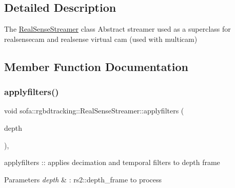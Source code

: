 \subsection{Detailed Description}
The \hyperlink{classsofa_1_1rgbdtracking_1_1_real_sense_streamer}{Real\+Sense\+Streamer} class Abstract streamer used as a superclass for realsensecam and realsense virtual cam (used with multicam) 

\subsection{Member Function Documentation}
\mbox{\label{classsofa_1_1rgbdtracking_1_1_real_sense_streamer_a2764d9aa83b005b5872f195599b98fc6}} 
\subsubsection{\texorpdfstring{applyfilters()}{applyfilters()}}
{\footnotesize\ttfamily void sofa\+::rgbdtracking\+::\+Real\+Sense\+Streamer\+::applyfilters (\begin{DoxyParamCaption}\item[{rs2\+::depth\+\_\+frame \&}]{depth }\end{DoxyParamCaption})\hspace{0.3cm}{\ttfamily [inline]}, {\ttfamily [protected]}}



applyfilters \+:\+: applies decimation and temporal filters to depth frame 


\begin{DoxyParams}{Parameters}
{\em depth} & \+: rs2\+::depth\+\_\+frame to process \\
\hline
\end{DoxyParams}
\mbox{\label{classsofa_1_1rgbdtracking_1_1_real_sense_streamer_a3881452d7c26ef825640220be00fd034}} 

